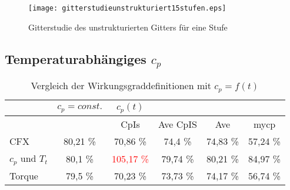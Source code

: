 \begin{figure}[htbp]
	\centering
	\texttt{[image: gitterstudieunstrukturiert15stufen.eps]}
	\caption{Gitterstudie des unstrukturierten Gitters für eine Stufe}
	\label{fig:gitterunstrukturiert15stufen}
\end{figure}

\subsection{Temperaturabhängiges $c_p$}
\begin{table}[H]
	\centering
	\caption{Vergleich der Wirkungsgraddefinitionen mit $c_p = f(t)$}
	\begin{tabular}{ l| c | c c c c}
	&	$c_p = const.$	&	$c_p(t)$	&		&		&		\\
	\hline
	&		&	CpIs	&	Ave CpIS	&	Ave	&	mycp	\\
	\hline
	CFX	&	80,21 \%	&	70,86 \%	&	74,4 \%	&	74,83 \%	&	57,24 \%	\\
	$c_p$ und $T_t$	&	80,1 \%	&	\textcolor{red}{105,17 \%}	&	79,74 \%	&	80,21 \%	&	84,97 \%	\\
	Torque	&	79,5 \%	&	70,23 \%	&	73,73 \%	&	74,17 \%	&	56,74 \%	\\
	
	\end{tabular}
	\label{tab:unstrukturiertmycp}
\end{table}